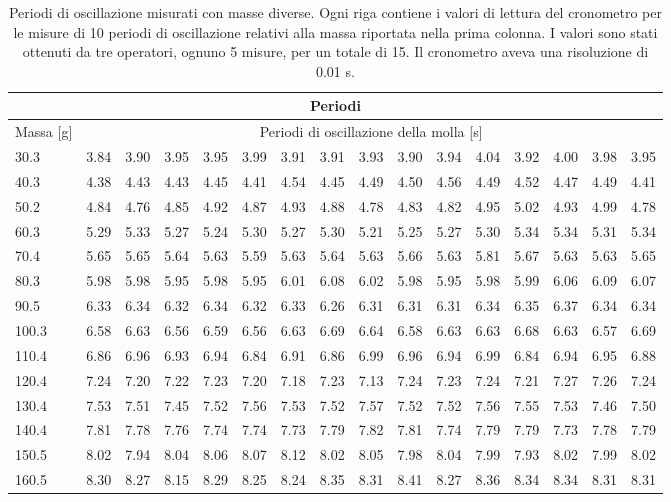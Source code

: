 \begin{table}
    \centering
    \scriptsize
    \begin{tabular}{l | c c c c c c c c c c c c c c c}
        \multicolumn{16}{c}{\small \textbf{Periodi}} \\[1mm]
        \toprule
        {\footnotesize Massa [g]} & \multicolumn{15}{c}{\footnotesize Periodi di oscillazione della molla [s]} \\
        \midrule
		30.3 & 3.84 & 3.90 & 3.95 & 3.95 & 3.99 & 3.91 & 3.91 & 3.93 & 3.90 & 3.94 & 4.04 & 3.92 & 4.00 & 3.98 & 3.95 \\
		40.3 & 4.38 & 4.43 & 4.43 & 4.45 & 4.41 & 4.54 & 4.45 & 4.49 & 4.50 & 4.56 & 4.49 & 4.52 & 4.47 & 4.49 & 4.41 \\
		50.2 & 4.84 & 4.76 & 4.85 & 4.92 & 4.87 & 4.93 & 4.88 & 4.78 & 4.83 & 4.82 & 4.95 & 5.02 & 4.93 & 4.99 & 4.78 \\
		60.3 & 5.29 & 5.33 & 5.27 & 5.24 & 5.30 & 5.27 & 5.30 & 5.21 & 5.25 & 5.27 & 5.30 & 5.34 & 5.34 & 5.31 & 5.34 \\
		70.4 & 5.65 & 5.65 & 5.64 & 5.63 & 5.59 & 5.63 & 5.64 & 5.63 & 5.66 & 5.63 & 5.81 & 5.67 & 5.63 & 5.63 & 5.65 \\
		80.3 & 5.98 & 5.98 & 5.95 & 5.98 & 5.95 & 6.01 & 6.08 & 6.02 & 5.98 & 5.95 & 5.98 & 5.99 & 6.06 & 6.09 & 6.07 \\
		90.5 & 6.33 & 6.34 & 6.32 & 6.34 & 6.32 & 6.33 & 6.26 & 6.31 & 6.31 & 6.31 & 6.34 & 6.35 & 6.37 & 6.34 & 6.34 \\
		100.3 & 6.58 & 6.63 & 6.56 & 6.59 & 6.56 & 6.63 & 6.69 & 6.64 & 6.58 & 6.63 & 6.63 & 6.68 & 6.63 & 6.57 & 6.69 \\
		110.4 & 6.86 & 6.96 & 6.93 & 6.94 & 6.84 & 6.91 & 6.86 & 6.99 & 6.96 & 6.94 & 6.99 & 6.84 & 6.94 & 6.95 & 6.88 \\
		120.4 & 7.24 & 7.20 & 7.22 & 7.23 & 7.20 & 7.18 & 7.23 & 7.13 & 7.24 & 7.23 & 7.24 & 7.21 & 7.27 & 7.26 & 7.24 \\
		130.4 & 7.53 & 7.51 & 7.45 & 7.52 & 7.56 & 7.53 & 7.52 & 7.57 & 7.52 & 7.52 & 7.56 & 7.55 & 7.53 & 7.46 & 7.50 \\
		140.4 & 7.81 & 7.78 & 7.76 & 7.74 & 7.74 & 7.73 & 7.79 & 7.82 & 7.81 & 7.74 & 7.79 & 7.79 & 7.73 & 7.78 & 7.79 \\
		150.5 & 8.02 & 7.94 & 8.04 & 8.06 & 8.07 & 8.12 & 8.02 & 8.05 & 7.98 & 8.04 & 7.99 & 7.93 & 8.02 & 7.99 & 8.02 \\
		160.5 & 8.30 & 8.27 & 8.15 & 8.29 & 8.25 & 8.24 & 8.35 & 8.31 & 8.41 & 8.27 & 8.36 & 8.34 & 8.34 & 8.31 & 8.31 \\
        \bottomrule
    \end{tabular}
    \caption{Periodi di oscillazione misurati con masse diverse. Ogni riga contiene i valori di lettura del cronometro per le misure di 10 periodi di oscillazione relativi alla massa riportata nella prima colonna. I valori sono stati ottenuti da tre operatori, ognuno 5 misure, per un totale di 15. Il cronometro aveva una risoluzione di 0.01 s.}
    \label{tab:periodi}
\end{table}

